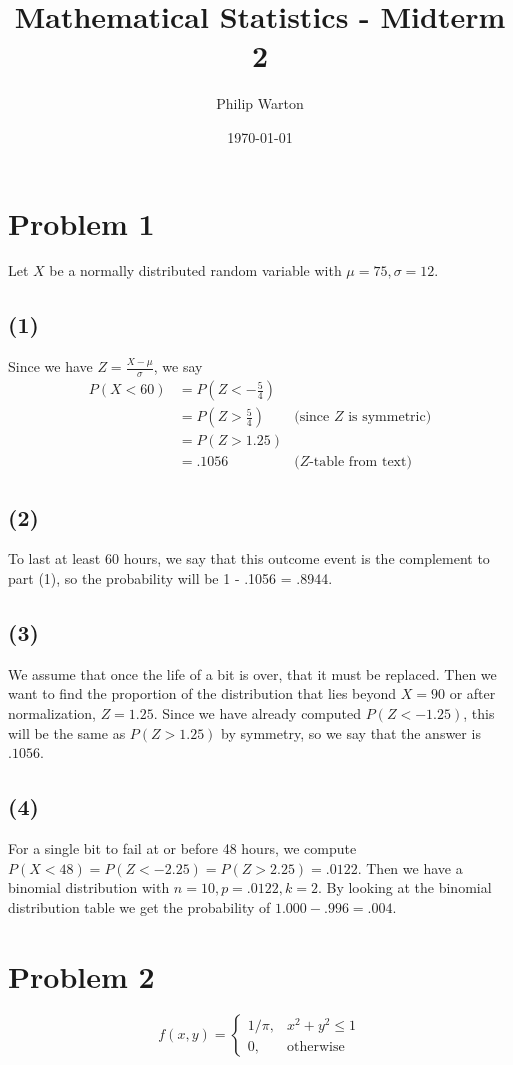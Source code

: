 \documentclass{article}
\theoremstyle{definition}
\begin{document}
\title{Mathematical Statistics - Midterm 2}
\author{Philip Warton}
\date{\today}
\maketitle

\section*{Problem 1}
    Let $X$ be a normally distributed random variable with $\mu = 75, \sigma = 12$.
    \subsection*{(1)}
        Since we have $Z = \frac{X - \mu}{\sigma}$, we say
        \begin{align*}
            P(X < 60) &= P(Z < - \frac{5}{4})\\
            &= P(Z > \frac{5}{4}) & \text{(since $Z$ is symmetric)}\\
            &= P(Z > 1.25)\\
            &= .1056 & \text{($Z$-table from text)}
        \end{align*}
    \subsection*{(2)}
        To last at least 60 hours, we say that this outcome event is the complement to part (1),
        so the probability will be 1 - .1056 = .8944.
    \subsection*{(3)}
        We assume that once the life of a bit is over, that it must be replaced.
        Then we want to find the proportion of the distribution that lies beyond $X = 90$
        or after normalization, $Z = 1.25$. Since we have already computed $P(Z < -1.25)$, this
        will be the same as $P(Z > 1.25)$ by symmetry, so we say that the answer is $.1056$.
    \subsection*{(4)}
        For a single bit to fail at or before 48 hours, we compute $P(X < 48) = P(Z < -2.25) = P(Z > 2.25) = .0122$.
        Then we have a binomial distribution with $n = 10, p = .0122, k = 2$. By looking at the binomial distribution
        table we get the probability of $1.000 - .996 = .004$.
\section*{Problem 2}
    \[
        f(x,y) = 
        \begin{cases}
            1 / \pi, & x^2 + y^2 \leqslant 1\\
            0, & \text{otherwise}
        \end{cases}
    \]
\end{document}
